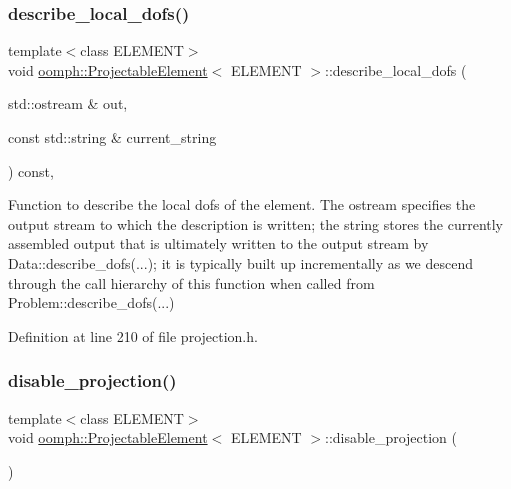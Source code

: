 \subsubsection{\texorpdfstring{describe\+\_\+local\+\_\+dofs()}{describe\_local\_dofs()}}
{\footnotesize\ttfamily template$<$class E\+L\+E\+M\+E\+NT$>$ \\
void \hyperlink{classoomph_1_1ProjectableElement}{oomph\+::\+Projectable\+Element}$<$ E\+L\+E\+M\+E\+NT $>$\+::describe\+\_\+local\+\_\+dofs (\begin{DoxyParamCaption}\item[{std\+::ostream \&}]{out,  }\item[{const std\+::string \&}]{current\+\_\+string }\end{DoxyParamCaption}) const\hspace{0.3cm}{\ttfamily [inline]}, {\ttfamily [protected]}}



Function to describe the local dofs of the element. The ostream specifies the output stream to which the description is written; the string stores the currently assembled output that is ultimately written to the output stream by Data\+::describe\+\_\+dofs(...); it is typically built up incrementally as we descend through the call hierarchy of this function when called from Problem\+::describe\+\_\+dofs(...) 



Definition at line 210 of file projection.\+h.

\mbox{\label{classoomph_1_1ProjectableElement_afd30334bf9f7cf2e9d210b7705bd8572}} 
\subsubsection{\texorpdfstring{disable\+\_\+projection()}{disable\_projection()}}
{\footnotesize\ttfamily template$<$class E\+L\+E\+M\+E\+NT$>$ \\
void \hyperlink{classoomph_1_1ProjectableElement}{oomph\+::\+Projectable\+Element}$<$ E\+L\+E\+M\+E\+NT $>$\+::disable\+\_\+projection (\begin{DoxyParamCaption}{ }\end{DoxyParamCaption})\hspace{0.3cm}{\ttfamily [inline]}}



